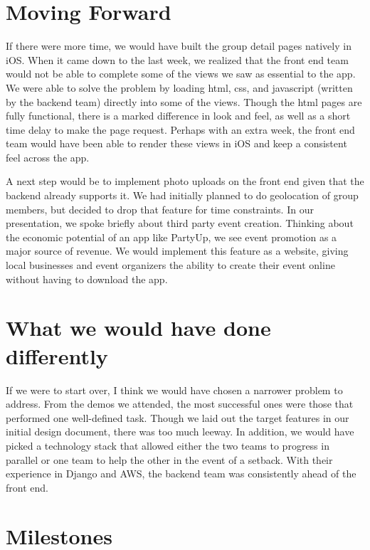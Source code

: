 \documentclass[12pt]{article}
\begin{document}
\section{Moving Forward}

If there were more time, we would have built the group detail pages natively in iOS. When it came down to the last week, we realized that the front end team would not be able to complete some of the views we saw as essential to the app. We were able to solve the problem by loading html, css, and javascript (written by the backend team) directly into some of the views. Though the html pages are fully functional, there is a marked difference in look and feel, as well as a short time delay to make the page request. Perhaps with an extra week, the front end team would have been able to render these views in iOS and keep a consistent feel across the app. 

\bigskip

A next step would be to implement photo uploads on the front end given that the backend already supports it. We had initially planned to do geolocation of group members, but decided to drop that feature for time constraints. In our presentation, we spoke briefly about third party event creation. Thinking about the economic potential of an app like PartyUp, we see event promotion as a major source of revenue. We would implement this feature as a website, giving local businesses and event organizers the ability to create their event online without having to download the app.

\bigskip

\section{What we would have done differently}

If we were to start over, I think we would have chosen a narrower problem to address. From the demos we attended, the most successful ones were those that performed one well-defined task. Though we laid out the target features in our initial design document, there was too much leeway. In addition, we would have picked a technology stack that allowed either the two teams to progress in parallel or one team to help the other in the event of a setback. With their experience in Django and AWS, the backend team was consistently ahead of the front end.

\bigskip

\section{Milestones}
\end{document}
